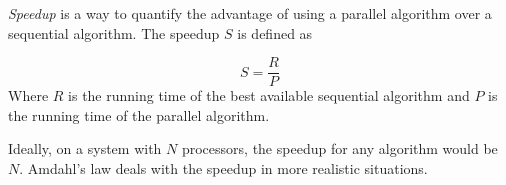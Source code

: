 \documentclass{article}
\begin{document}
\emph{Speedup} is a way to quantify the advantage of using a parallel algorithm over a sequential algorithm.  The speedup $S$ is defined as

$$ S = \frac{R}{P} $$
Where $R$ is the running time of the best available sequential algorithm and $P$ is the running time of the parallel algorithm.  

Ideally, on a system with $N$ processors, the speedup for any algorithm would be $N$.  Amdahl's law deals with the speedup in more realistic situations.
\end{document}

